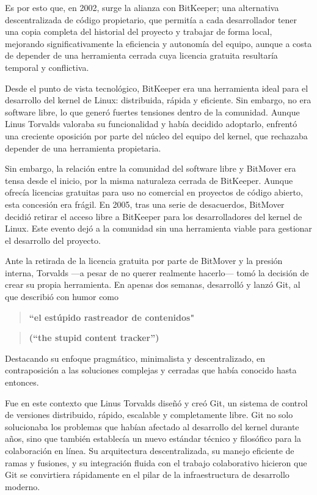 \documentclass[a4paper,12pt]{article}
\begin{document}
Es por esto que, en 2002, surge la alianza con BitKeeper; una alternativa
descentralizada de código propietario, que permitía a cada desarrollador
tener una copia completa del historial del proyecto y trabajar de forma local,
mejorando significativamente la eficiencia y autonomía del equipo, aunque a
costa de depender de una herramienta cerrada cuya licencia gratuita resultaría
temporal y conflictiva.

Desde el punto de vista tecnológico, BitKeeper era una herramienta ideal para el
desarrollo del kernel de Linux: distribuida, rápida y eficiente. Sin embargo, no
era software libre, lo que generó fuertes tensiones dentro de la comunidad.
Aunque Linus Torvalds valoraba su funcionalidad y había decidido adoptarlo,
enfrentó una creciente oposición por parte del núcleo del equipo del kernel, que
rechazaba depender de una herramienta propietaria.

Sin embargo, la relación entre la comunidad del software libre y BitMover era
tensa desde el inicio, por la misma naturaleza cerrada de BitKeeper. Aunque
ofrecía licencias gratuitas para uso no comercial en proyectos de código
abierto, esta concesión era frágil. En 2005, tras una serie de desacuerdos,
BitMover decidió retirar el acceso libre a BitKeeper para los desarrolladores
del kernel de Linux. Este evento dejó a la comunidad sin una herramienta viable
para gestionar el desarrollo del proyecto.

Ante la retirada de la licencia gratuita por parte de BitMover y la presión
interna, Torvalds —a pesar de no querer realmente hacerlo— tomó la decisión de
crear su propia herramienta. En apenas dos semanas, desarrolló y lanzó Git, al
que describió con humor como 
\begin{quote}
\textbf{``el estúpido rastreador de contenidos"}
\end{quote}
\begin{quote}
\textbf{(“the stupid content tracker”)}
\end{quote}

Destacando su enfoque pragmático, minimalista y
descentralizado, en contraposición a las soluciones complejas y cerradas que
había conocido hasta entonces.

Fue en este contexto que Linus Torvalds diseñó y creó Git, un sistema de control
de versiones distribuido, rápido, escalable y completamente libre. Git no solo
solucionaba los problemas que habían afectado al desarrollo del kernel durante
años, sino que también establecía un nuevo estándar técnico y filosófico para la
colaboración en línea. Su arquitectura descentralizada, su manejo eficiente de
ramas y fusiones, y su integración fluida con el trabajo colaborativo hicieron
que Git se convirtiera rápidamente en el pilar de la infraestructura de
desarrollo moderno.
\end{document}
